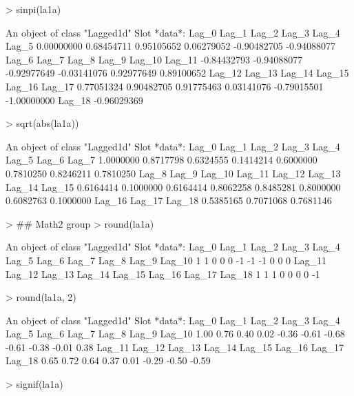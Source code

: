 \documentclass[a4paper,twoside,11pt,nojss,article]{jss}
\begin{document}
\begin{Schunk}
\begin{Sinput}
> sinpi(la1a)
\end{Sinput}
\begin{Soutput}
An object of class "Lagged1d"
Slot *data*: 
      Lag_0       Lag_1       Lag_2       Lag_3       Lag_4       Lag_5 
 0.00000000  0.68454711  0.95105652  0.06279052 -0.90482705 -0.94088077 
      Lag_6       Lag_7       Lag_8       Lag_9      Lag_10      Lag_11 
-0.84432793 -0.94088077 -0.92977649 -0.03141076  0.92977649  0.89100652 
     Lag_12      Lag_13      Lag_14      Lag_15      Lag_16      Lag_17 
 0.77051324  0.90482705  0.91775463  0.03141076 -0.79015501 -1.00000000 
     Lag_18 
-0.96029369 
\end{Soutput}
\begin{Sinput}
> sqrt(abs(la1a))
\end{Sinput}
\begin{Soutput}
An object of class "Lagged1d"
Slot *data*: 
    Lag_0     Lag_1     Lag_2     Lag_3     Lag_4     Lag_5     Lag_6     Lag_7 
1.0000000 0.8717798 0.6324555 0.1414214 0.6000000 0.7810250 0.8246211 0.7810250 
    Lag_8     Lag_9    Lag_10    Lag_11    Lag_12    Lag_13    Lag_14    Lag_15 
0.6164414 0.1000000 0.6164414 0.8062258 0.8485281 0.8000000 0.6082763 0.1000000 
   Lag_16    Lag_17    Lag_18 
0.5385165 0.7071068 0.7681146 
\end{Soutput}
\begin{Sinput}
> ## Math2 group
> round(la1a)
\end{Sinput}
\begin{Soutput}
An object of class "Lagged1d"
Slot *data*: 
 Lag_0  Lag_1  Lag_2  Lag_3  Lag_4  Lag_5  Lag_6  Lag_7  Lag_8  Lag_9 Lag_10 
     1      1      0      0      0     -1     -1     -1      0      0      0 
Lag_11 Lag_12 Lag_13 Lag_14 Lag_15 Lag_16 Lag_17 Lag_18 
     1      1      1      0      0      0      0     -1 
\end{Soutput}
\begin{Sinput}
> round(la1a, 2)
\end{Sinput}
\begin{Soutput}
An object of class "Lagged1d"
Slot *data*: 
 Lag_0  Lag_1  Lag_2  Lag_3  Lag_4  Lag_5  Lag_6  Lag_7  Lag_8  Lag_9 Lag_10 
  1.00   0.76   0.40   0.02  -0.36  -0.61  -0.68  -0.61  -0.38  -0.01   0.38 
Lag_11 Lag_12 Lag_13 Lag_14 Lag_15 Lag_16 Lag_17 Lag_18 
  0.65   0.72   0.64   0.37   0.01  -0.29  -0.50  -0.59 
\end{Soutput}
\begin{Sinput}
> signif(la1a)
\end{Sinput}
\begin{Soutput}

\end{Soutput}
\end{Schunk}
\end{document}
